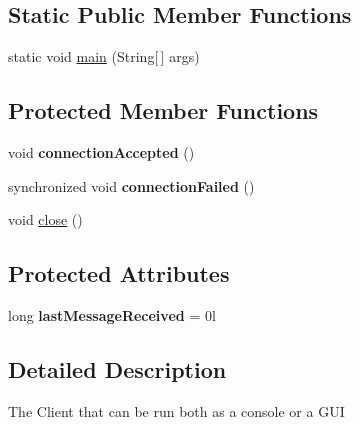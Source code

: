 \subsection*{Static Public Member Functions}
\begin{DoxyCompactItemize}
\item 
static void \hyperlink{classgov_1_1fnal_1_1ppd_1_1dd_1_1chat_1_1xml_1_1MessagingClient_a67d989753c272db54e6d341a129f5bee}{main} (String\mbox{[}$\,$\mbox{]} args)
\end{DoxyCompactItemize}
\subsection*{Protected Member Functions}
\begin{DoxyCompactItemize}
\item 
\hypertarget{classgov_1_1fnal_1_1ppd_1_1dd_1_1chat_1_1xml_1_1MessagingClient_a5fa08dff16f2f32b403441970626d751}{void {\bfseries connection\-Accepted} ()}\label{classgov_1_1fnal_1_1ppd_1_1dd_1_1chat_1_1xml_1_1MessagingClient_a5fa08dff16f2f32b403441970626d751}

\item 
\hypertarget{classgov_1_1fnal_1_1ppd_1_1dd_1_1chat_1_1xml_1_1MessagingClient_af032a0e3f652df55ee1d4f86239c6079}{synchronized void {\bfseries connection\-Failed} ()}\label{classgov_1_1fnal_1_1ppd_1_1dd_1_1chat_1_1xml_1_1MessagingClient_af032a0e3f652df55ee1d4f86239c6079}

\item 
void \hyperlink{classgov_1_1fnal_1_1ppd_1_1dd_1_1chat_1_1xml_1_1MessagingClient_ade76cbc4bf672f3096e4bbdd5198f4e8}{close} ()
\end{DoxyCompactItemize}
\subsection*{Protected Attributes}
\begin{DoxyCompactItemize}
\item 
\hypertarget{classgov_1_1fnal_1_1ppd_1_1dd_1_1chat_1_1xml_1_1MessagingClient_a7991a4ced5b98b7b21d4facbcad736bd}{long {\bfseries last\-Message\-Received} = 0l}\label{classgov_1_1fnal_1_1ppd_1_1dd_1_1chat_1_1xml_1_1MessagingClient_a7991a4ced5b98b7b21d4facbcad736bd}

\end{DoxyCompactItemize}


\subsection{Detailed Description}
The Client that can be run both as a console or a G\-U\-I 


